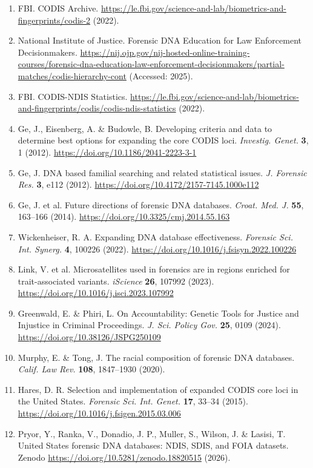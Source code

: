 \documentclass[11pt]{article}
\begin{document}
\begin{enumerate}

\item FBI. CODIS Archive. \url{https://le.fbi.gov/science-and-lab/biometrics-and-fingerprints/codis-2} (2022).

\item National Institute of Justice. Forensic DNA Education for Law Enforcement Decisionmakers. \url{https://nij.ojp.gov/nij-hosted-online-training-courses/forensic-dna-education-law-enforcement-decisionmakers/partial-matches/codis-hierarchy-cont} (Accessed: 2025).

\item FBI. CODIS-NDIS Statistics. \url{https://le.fbi.gov/science-and-lab/biometrics-and-fingerprints/codis/codis-ndis-statistics} (2022).

\item Ge, J., Eisenberg, A. \& Budowle, B. Developing criteria and data to determine best options for expanding the core CODIS loci. \textit{Investig. Genet.} \textbf{3}, 1 (2012). \url{https://doi.org/10.1186/2041-2223-3-1}

\item Ge, J. DNA based familial searching and related statistical issues. \textit{J. Forensic Res.} \textbf{3}, e112 (2012). \url{https://doi.org/10.4172/2157-7145.1000e112}

\item Ge, J. et al. Future directions of forensic DNA databases. \textit{Croat. Med. J.} \textbf{55}, 163--166 (2014). \url{https://doi.org/10.3325/cmj.2014.55.163}

\item Wickenheiser, R. A. Expanding DNA database effectiveness. \textit{Forensic Sci. Int. Synerg.} \textbf{4}, 100226 (2022). \url{https://doi.org/10.1016/j.fsisyn.2022.100226}

\item Link, V. et al. Microsatellites used in forensics are in regions enriched for trait-associated variants. \textit{iScience} \textbf{26}, 107992 (2023). \url{https://doi.org/10.1016/j.isci.2023.107992}

\item Greenwald, E. \& Phiri, L. On Accountability: Genetic Tools for Justice and Injustice in Criminal Proceedings. \textit{J. Sci. Policy Gov.} \textbf{25}, 0109 (2024). \url{https://doi.org/10.38126/JSPG250109}

\item Murphy, E. \& Tong, J. The racial composition of forensic DNA databases. \textit{Calif. Law Rev.} \textbf{108}, 1847--1930 (2020).

\item Hares, D. R. Selection and implementation of expanded CODIS core loci in the United States. \textit{Forensic Sci. Int. Genet.} \textbf{17}, 33--34 (2015). \url{https://doi.org/10.1016/j.fsigen.2015.03.006}

\item Pryor, Y., Ranka, V., Donadio, J. P., Muller, S., Wilson, J. \& Lasisi, T. United States forensic DNA databases: NDIS, SDIS, and FOIA datasets. Zenodo \url{https://doi.org/10.5281/zenodo.18820515} (2026).

\end{enumerate}
\end{document}
